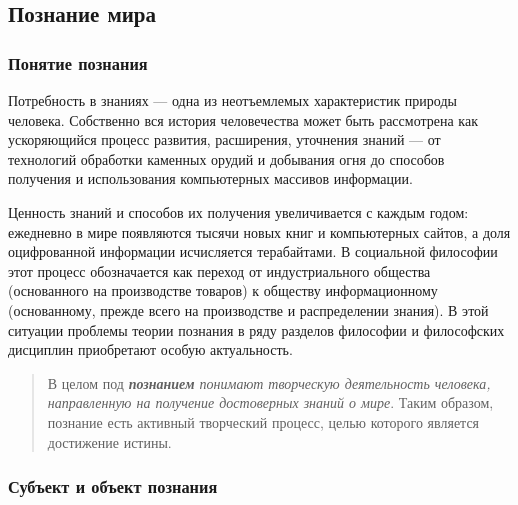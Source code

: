 \documentclass[
]{article}
\begin{document}
\hypertarget{ux43fux43eux437ux43dux430ux43dux438ux435-ux43cux438ux440ux430}{%
\subsection{Познание
мира}\label{ux43fux43eux437ux43dux430ux43dux438ux435-ux43cux438ux440ux430}}

\hypertarget{ux43fux43eux43dux44fux442ux438ux435-ux43fux43eux437ux43dux430ux43dux438ux44f}{%
\subsubsection{Понятие
познания}\label{ux43fux43eux43dux44fux442ux438ux435-ux43fux43eux437ux43dux430ux43dux438ux44f}}

Потребность в знаниях --- одна из неотъемлемых характеристик природы
человека. Собственно вся история человечества может быть рассмотрена как
ускоряющийся процесс развития, расширения, уточнения знаний --- от
технологий обработки каменных орудий и добывания огня до способов
получения и использования компьютерных массивов информации.

Ценность знаний и способов их получения увеличивается с каждым годом:
ежедневно в мире появляются тысячи новых книг и компьютерных сайтов, а
доля оцифрованной информации исчисляется терабайтами. В социальной
философии этот процесс обозначается как переход от индустриального
общества (основанного на производстве товаров) к обществу
информационному (основанному, прежде всего на производстве и
распределении знания). В этой ситуации проблемы теории познания в ряду
разделов философии и философских дисциплин приобретают особую
актуальность.

\begin{quote}
В целом под \emph{\textbf{познанием} понимают творческую деятельность
человека, направленную на получение достоверных знаний о мире}. Таким
образом, познание есть активный творческий процесс, целью которого
является достижение истины.
\end{quote}

\hypertarget{ux441ux443ux431ux44aux435ux43aux442-ux438-ux43eux431ux44aux435ux43aux442-ux43fux43eux437ux43dux430ux43dux438ux44f}{%
\subsubsection{Субъект и объект
познания}\label{ux441ux443ux431ux44aux435ux43aux442-ux438-ux43eux431ux44aux435ux43aux442-ux43fux43eux437ux43dux430ux43dux438ux44f}}
\end{document}
